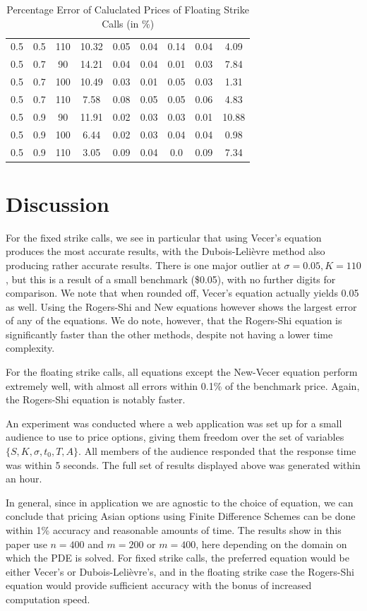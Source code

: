 \documentclass{article}
\begin{document}
\begin{table}[H]
\begin{tabular}{|c|c|c|c|c|c|c|c|c|}
  0.5 & 0.5 & 110 & 10.32 & 0.05 & 0.04 & 0.14 & 0.04 & 4.09 \\
  0.5 & 0.7 & 90 & 14.21 & 0.04 & 0.04 & 0.01 & 0.03 & 7.84 \\
  0.5 & 0.7 & 100 & 10.49 & 0.03 & 0.01 & 0.05 & 0.03 & 1.31 \\
  0.5 & 0.7 & 110 & 7.58 & 0.08 & 0.05 & 0.05 & 0.06 & 4.83 \\
  0.5 & 0.9 & 90 & 11.91 & 0.02 & 0.03 & 0.03 & 0.01 & 10.88 \\
  0.5 & 0.9 & 100 & 6.44 & 0.02 & 0.03 & 0.04 & 0.04 & 0.98 \\
  0.5 & 0.9 & 110 & 3.05 & 0.09 & 0.04 & 0.0 & 0.09 & 7.34 \\
  \hline
  \end{tabular}
  \caption{Percentage Error of Caluclated Prices of Floating Strike Calls (in \%)}
  \label{table:name}
\end{table}
\normalsize

\section{Discussion}
For the fixed strike calls, we see in particular that using Vecer's equation produces the most accurate results, with the Dubois-Leli\`evre method also producing rather accurate results. There is one major outlier at \(\sigma=0.05, K=110\), but this is a result of a small benchmark (\$0.05), with no further digits for comparison. We note that when rounded off, Vecer's equation actually yields 0.05 as well. Using the Rogers-Shi and New equations however shows the largest error of any of the equations. We do note, however, that the Rogers-Shi equation is significantly faster than the other methods, despite not having a lower time complexity.

For the floating strike calls, all equations except the New-Vecer equation perform extremely well, with almost all errors within 0.1\% of the benchmark price. Again, the Rogers-Shi equation is notably faster.

An experiment was conducted where a web application was set up for a small audience to use to price options, giving them freedom over the set of variables \(\{S, K, \sigma, t_0, T, A\}\). All members of the audience responded that the response time was within 5 seconds. The full set of results displayed above was generated within an hour.

In general, since in application we are agnostic to the choice of equation, we can conclude that pricing Asian options using Finite Difference Schemes can be done within 1\% accuracy and reasonable amounts of time. The results show in this paper use \(n=400\) and \(m = 200\) or \(m=400\), here depending on the domain on which the PDE is solved. For fixed strike calls, the preferred equation would be either Vecer's or Dubois-Leli\`evre's, and in the floating strike case the Rogers-Shi equation would provide sufficient accuracy with the bonus of increased computation speed.
\end{document}
